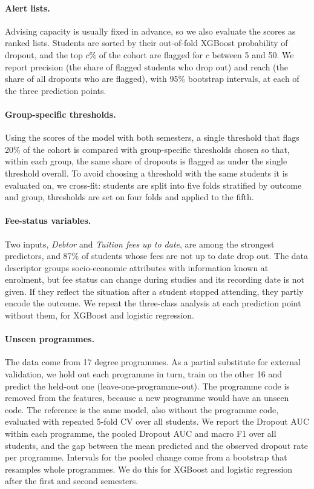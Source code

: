 \documentclass[11pt,a4paper]{article}
\begin{document}
\paragraph{Alert lists.} Advising capacity is usually fixed in advance, so we also evaluate the scores as ranked lists. Students are sorted by their out-of-fold XGBoost probability of dropout, and the top $c\%$ of the cohort are flagged for $c$ between 5 and 50. We report precision (the share of flagged students who drop out) and reach (the share of all dropouts who are flagged), with 95\% bootstrap intervals, at each of the three prediction points.

\paragraph{Group-specific thresholds.} Using the scores of the model with both semesters, a single threshold that flags 20\% of the cohort is compared with group-specific thresholds chosen so that, within each group, the same share of dropouts is flagged as under the single threshold overall. To avoid choosing a threshold with the same students it is evaluated on, we cross-fit: students are split into five folds stratified by outcome and group, thresholds are set on four folds and applied to the fifth.

\paragraph{Fee-status variables.} Two inputs, \emph{Debtor} and \emph{Tuition fees up to date}, are among the strongest predictors, and 87\% of students whose fees are not up to date drop out. The data descriptor groups socio-economic attributes with information known at enrolment, but fee status can change during studies and its recording date is not given. If they reflect the situation after a student stopped attending, they partly encode the outcome. We repeat the three-class analysis at each prediction point without them, for XGBoost and logistic regression.

\paragraph{Unseen programmes.} The data come from 17 degree programmes. As a partial substitute for external validation, we hold out each programme in turn, train on the other 16 and predict the held-out one (leave-one-programme-out). The programme code is removed from the features, because a new programme would have an unseen code. The reference is the same model, also without the programme code, evaluated with repeated 5-fold CV over all students. We report the Dropout AUC within each programme, the pooled Dropout AUC and macro F1 over all students, and the gap between the mean predicted and the observed dropout rate per programme. Intervals for the pooled change come from a bootstrap that resamples whole programmes. We do this for XGBoost and logistic regression after the first and second semesters.
\end{document}
